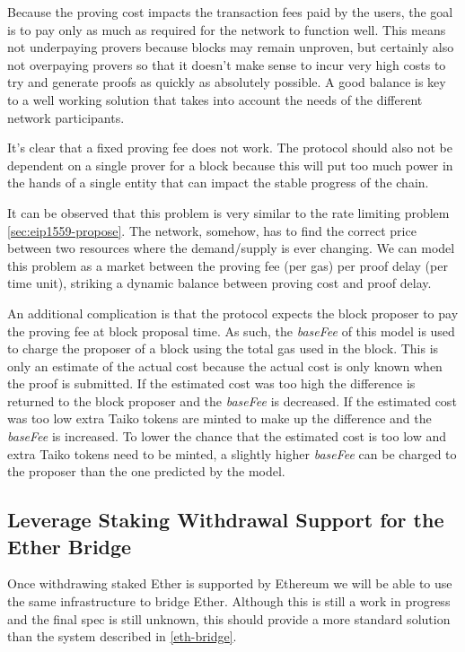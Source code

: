 \documentclass[9pt,oneside]{amsart}
\begin{document}
\begin{multicols}{2}
Because the proving cost impacts the transaction fees paid by the users, the goal is to pay only as much as required for the network to function well. This means not underpaying provers because blocks may remain unproven, but certainly also not overpaying provers so that it doesn't make sense to incur very high costs to try and generate proofs as quickly as absolutely possible. A good balance is key to a well working solution that takes into account the needs of the different network participants.

It's clear that a fixed proving fee does not work. The protocol should also not be dependent on a single prover for a block because this will put too much power in the hands of a single entity that can impact the stable progress of the chain. 

It can be observed that this problem is very similar to the rate limiting problem \ref{sec:eip1559-propose}. The network, somehow, has to find the correct price between two resources where the demand/supply is ever changing. We can model this problem as a market between the proving fee (per gas) per proof delay (per time unit), striking a dynamic balance between proving cost and proof delay.

An additional complication is that the protocol expects the block proposer to pay the proving fee at block proposal time. As such, the \emph{baseFee} of this model is used to charge the proposer of a block using the total gas used in the block. This is only an estimate of the actual cost because the actual cost is only known when the proof is submitted. If the estimated cost was too high the difference is returned to the block proposer and the \emph{baseFee} is decreased. If the estimated cost was too low extra Taiko tokens are minted to make up the difference and the \emph{baseFee} is increased. To lower the chance that the estimated cost is too low and extra Taiko tokens need to be minted, a slightly higher \emph{baseFee} can be charged to the proposer than the one predicted by the model.

\subsection{Leverage Staking Withdrawal Support for the Ether Bridge}\label{sec:withdrawals}
Once withdrawing staked Ether is supported by Ethereum we will be able to use the same infrastructure to bridge Ether. Although this is still a work in progress and the final spec is still unknown, this should provide a more standard solution than the system described in \ref{eth-bridge}.

\end{multicols}
\end{document}

